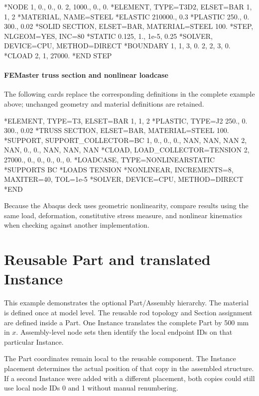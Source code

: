 \begin{inputdeck}
*NODE
1,    0., 0., 0.
2, 1000., 0., 0.
*ELEMENT, TYPE=T3D2, ELSET=BAR
1, 1, 2
*MATERIAL, NAME=STEEL
*ELASTIC
210000., 0.3
*PLASTIC
250., 0.
300., 0.02
*SOLID SECTION, ELSET=BAR,
 MATERIAL=STEEL
100.
*STEP, NLGEOM=YES, INC=80
*STATIC
0.125, 1., 1e-5, 0.25
*SOLVER, DEVICE=CPU, METHOD=DIRECT
*BOUNDARY
1, 1, 3, 0.
2, 2, 3, 0.
*CLOAD
2, 1, 27000.
*END STEP
\end{inputdeck}

\paragraph*{FEMaster truss section and nonlinear loadcase}

The following cards replace the corresponding definitions in the
complete example above; unchanged geometry and material definitions
are retained.

\begin{inputdeck}
*ELEMENT, TYPE=T3, ELSET=BAR
1, 1, 2
*PLASTIC, TYPE=J2
250., 0.
300., 0.02
*TRUSS SECTION, ELSET=BAR, MATERIAL=STEEL
100.
*SUPPORT, SUPPORT_COLLECTOR=BC
1, 0., 0., 0., NAN, NAN, NAN
2, NAN, 0., 0., NAN, NAN, NAN
*CLOAD, LOAD_COLLECTOR=TENSION
2, 27000., 0., 0., 0., 0., 0.
*LOADCASE, TYPE=NONLINEARSTATIC
*SUPPORTS
BC
*LOADS
TENSION
*NONLINEAR, INCREMENTS=8, MAXITER=40, TOL=1e-5
*SOLVER, DEVICE=CPU, METHOD=DIRECT
*END
\end{inputdeck}

Because the Abaqus deck uses geometric nonlinearity, compare results using the same load, deformation, constitutive stress measure, and nonlinear kinematics when checking against another implementation.

\section{Reusable Part and translated Instance}

This example demonstrates the optional Part/Assembly hierarchy. The material is defined once at model level. The reusable rod topology and Section assignment are defined inside a Part. One Instance translates the complete Part by 500 mm in \(x\). Assembly-level node sets then identify the local endpoint IDs on that particular Instance.

The Part coordinates remain local to the reusable component. The Instance placement determines the actual position of that copy in the assembled structure. If a second Instance were added with a different placement, both copies could still use local node IDs 0 and 1 without manual renumbering.

